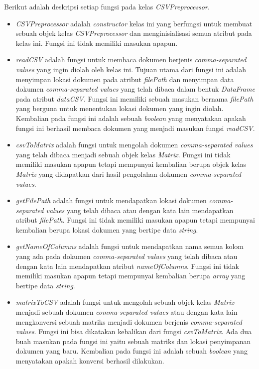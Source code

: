 Berikut adalah deskripsi setiap fungsi pada kelas \textit{CSVPreprocessor}.
\begin{itemize}
	\item \textit{CSVPreprocessor} adalah \textit{constructor} kelas ini yang berfungsi untuk membuat sebuah objek kelas \textit{CSVPreprocessor} dan menginisialisasi semua atribut pada kelas ini. Fungsi ini tidak memiliki masukan apapun.
	\item \textit{readCSV} adalah fungsi untuk membaca dokumen berjenis \textit{comma-separated values} yang ingin diolah oleh kelas ini. Tujuan utama dari fungsi ini adalah menyimpan lokasi dokumen pada atribut \textit{filePath} dan menyimpan data dokumen \textit{comma-separated values} yang telah dibaca dalam bentuk \textit{DataFrame} pada atribut \textit{dataCSV}. Fungsi ini memiliki sebuah masukan bernama \textit{filePath} yang berguna untuk menentukan lokasi dokumen yang ingin diolah. Kembalian pada fungsi ini adalah sebuah \textit{boolean} yang menyatakan apakah fungsi ini berhasil membaca dokumen yang menjadi masukan fungsi \textit{readCSV}.
	\item \textit{csvToMatrix} adalah fungsi untuk mengolah dokumen \textit{comma-separated values} yang telah dibaca menjadi sebuah objek kelas \textit{Matrix}. Fungsi ini tidak memiliki masukan apapun tetapi mempunyai kembalian berupa objek kelas \textit{Matrix} yang didapatkan dari hasil pengolahan dokumen \textit{comma-separated values}.
	\item \textit{getFilePath} adalah fungsi untuk mendapatkan lokasi dokumen \textit{comma-separated values} yang telah dibaca atau dengan kata lain mendapatkan atribut \textit{filePath}. Fungsi ini tidak memiliki masukan apapun tetapi mempunyai kembalian berupa lokasi dokumen yang bertipe data \textit{string}.
	\item \textit{getNameOfColumns} adalah fungsi untuk mendapatkan nama semua kolom yang ada pada dokumen \textit{comma-separated values} yang telah dibaca atau dengan kata lain mendapatkan atribut \textit{nameOfColumns}. Fungsi ini tidak memiliki masukan apapun tetapi mempunyai kembalian berupa \textit{array} yang bertipe data \textit{string}.
	\item \textit{matrixToCSV} adalah fungsi untuk mengolah sebuah objek kelas \textit{Matrix} menjadi sebuah dokumen \textit{comma-separated values} atau dengan kata lain mengkonversi sebuah matriks menjadi dokumen berjenis \textit{comma-separated values}. Fungsi ini bisa dikatakan kebalikan dari fungsi \textit{csvToMatrix}. Ada dua buah masukan pada fungsi ini yaitu sebuah matriks dan lokasi penyimpanan dokumen yang baru. Kembalian pada fungsi ini adalah sebuah \textit{boolean} yang menyatakan apakah konversi berhasil dilakukan.
\end{itemize}

